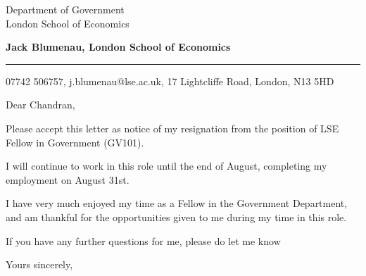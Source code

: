 \documentclass{letter} %
\begin{document}
\signature{Jack Blumenau}           %
\longindentation=0pt                       %
\let\raggedleft\raggedright                %
 
 
\begin{letter}{Department of Government \\
London School of Economics}


\begin{flushleft}
{\large\bf Jack Blumenau, London School of Economics}
\end{flushleft}
\medskip\hrule height 1pt
\begin{flushright}
\hfill 07742 506757, j.blumenau@lse.ac.uk, 17 Lightcliffe Road, London, N13 5HD 
\end{flushright} 
\vfill %

 
\opening{Dear Chandran,} 
 
\noindent Please accept this letter as notice of my resignation from the position of LSE Fellow in Government (GV101).
 
\noindent I will continue to work in this role until the end of August, completing my employment on August 31st.

\noindent I have very much enjoyed my time as a Fellow in the Government Department, and am thankful for the opportunities given to me during my time in this role.

\noindent If you have any further questions for me, please do let me know
 
\closing{Yours sincerely,} 
 \vfill

 \vfill
\vfill
\vfill
\end{letter}
 
\end{document}
